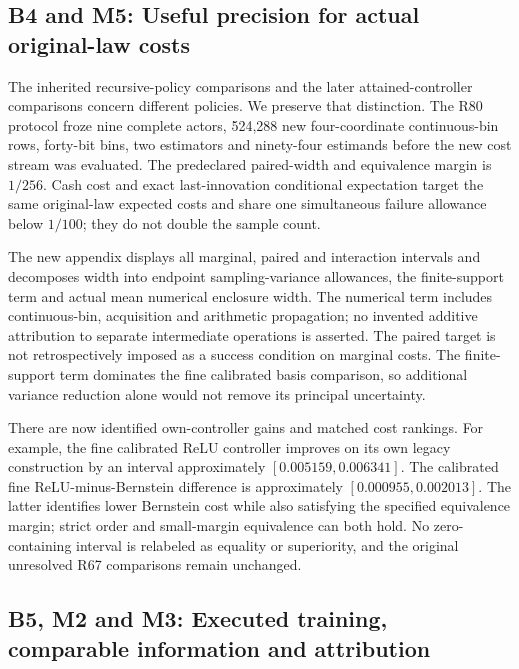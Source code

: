 \documentclass[ecta,nameyear,draft]{econsocart}
\begin{document}
\hypertarget{b4-and-m5-useful-precision-for-actual-original-law-costs}{%
\subsection{B4 and M5: Useful precision for actual original-law
costs}\label{b4-and-m5-useful-precision-for-actual-original-law-costs}}

The inherited recursive-policy comparisons and the later
attained-controller comparisons concern different policies. We preserve
that distinction. The R80 protocol froze nine complete actors, 524,288
new four-coordinate continuous-bin rows, forty-bit bins, two estimators
and ninety-four estimands before the new cost stream was evaluated. The
predeclared paired-width and equivalence margin is \(1/256\). Cash cost
and exact last-innovation conditional expectation target the same
original-law expected costs and share one simultaneous failure allowance
below \(1/100\); they do not double the sample count.

The new appendix displays all marginal, paired and interaction intervals
and decomposes width into endpoint sampling-variance allowances, the
finite-support term and actual mean numerical enclosure width. The
numerical term includes continuous-bin, acquisition and arithmetic
propagation; no invented additive attribution to separate intermediate
operations is asserted. The paired target is not retrospectively imposed
as a success condition on marginal costs. The finite-support term
dominates the fine calibrated basis comparison, so additional variance
reduction alone would not remove its principal uncertainty.

There are now identified own-controller gains and matched cost rankings.
For example, the fine calibrated ReLU controller improves on its own
legacy construction by an interval approximately
\([0.005159,0.006341]\). The calibrated fine ReLU-minus-Bernstein
difference is approximately \([0.000955,0.002013]\). The latter
identifies lower Bernstein cost while also satisfying the specified
equivalence margin; strict order and small-margin equivalence can both
hold. No zero-containing interval is relabeled as equality or
superiority, and the original unresolved R67 comparisons remain
unchanged.

\hypertarget{b5-m2-and-m3-executed-training-comparable-information-and-attribution}{%
\subsection{B5, M2 and M3: Executed training, comparable information and
attribution}\label{b5-m2-and-m3-executed-training-comparable-information-and-attribution}}
\end{document}
